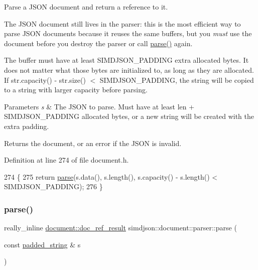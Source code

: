 Parse a J\+S\+ON document and return a reference to it. 

The J\+S\+ON document still lives in the parser\+: this is the most efficient way to parse J\+S\+ON documents because it reuses the same buffers, but you {\itshape must} use the document before you destroy the parser or call \hyperlink{classsimdjson_1_1document_1_1parser_a3eb1fd46ea0dad62eceed4b1c302b7ad}{parse()} again.

The buffer must have at least S\+I\+M\+D\+J\+S\+O\+N\+\_\+\+P\+A\+D\+D\+I\+NG extra allocated bytes. It does not matter what those bytes are initialized to, as long as they are allocated. If {\ttfamily str.\+capacity() -\/ str.\+size() $<$ S\+I\+M\+D\+J\+S\+O\+N\+\_\+\+P\+A\+D\+D\+I\+NG}, the string will be copied to a string with larger capacity before parsing.


\begin{DoxyParams}{Parameters}
{\em s} & The J\+S\+ON to parse. Must have at least len + S\+I\+M\+D\+J\+S\+O\+N\+\_\+\+P\+A\+D\+D\+I\+NG allocated bytes, or a new string will be created with the extra padding. \\
\hline
\end{DoxyParams}
\begin{DoxyReturn}{Returns}
the document, or an error if the J\+S\+ON is invalid. 
\end{DoxyReturn}


Definition at line 274 of file document.\+h.


\begin{DoxyCode}
274                                                                                       \{
275   \textcolor{keywordflow}{return} \hyperlink{classsimdjson_1_1document_1_1parser_a3eb1fd46ea0dad62eceed4b1c302b7ad}{parse}(s.data(), s.length(), s.capacity() - s.length() < SIMDJSON\_PADDING);
276 \}
\end{DoxyCode}
\mbox{\label{classsimdjson_1_1document_1_1parser_a5c062f8ab3f45a5cb144056dde60b993}} 
\subsubsection{\texorpdfstring{parse()}{parse()}\hspace{0.1cm}{\footnotesize\ttfamily [4/4]}}
{\footnotesize\ttfamily really\+\_\+inline \hyperlink{classsimdjson_1_1document_1_1doc__ref__result}{document\+::doc\+\_\+ref\+\_\+result} simdjson\+::document\+::parser\+::parse (\begin{DoxyParamCaption}\item[{const \hyperlink{structsimdjson_1_1padded__string}{padded\+\_\+string} \&}]{s }\end{DoxyParamCaption})\hspace{0.3cm}{\ttfamily [noexcept]}}



